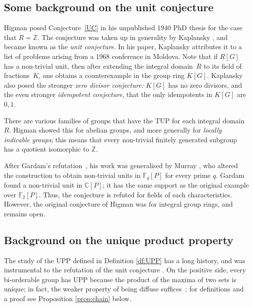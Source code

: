 \documentclass[11pt]{amsart}
\theoremstyle{mythm}
\theoremstyle{mydef}
\theoremstyle{myrem}
\numberwithin{equation}{section}
\newcommand{\ZZ}{{\mathbb{Z}}}
\begin{document}
\subsection{Some background on the unit conjecture}  
%
Higman posed Conjecture~\ref{UC}     in his unpublished 1940 PhD thesis \cite[p.~77]{H1}  for the case that $R = \ZZ$. The conjecture was  taken up  in generality  by Kaplansky \cite{K1}, and  became known as the   \textit{unit conjecture}.  In his paper, Kaplansky attributes it to a list of problems arising from a 1968 conference in Moldova.  Note that if  $R[G]$  has a non-trivial unit, then after extending  the integral domain~$R$ to  its field of fractions~$K$, one  obtains a   counterexample   in   the group ring $K[G]$.   Kaplansky also posed the stronger  {\it zero divisor conjecture:} $K[G]$ has no zero divisors, and the even stronger {\it idempotent conjecture}, that  the only idempotents in $K[G]$ are $0,1$.
 

There are various families   of groups that have the TUP for each integral domain $R$.   Higman   showed this    for abelian groups, and more generally for \textit{locally indicable groups}; this means that    every non-trivial finitely generated subgroup has a quotient isomorphic to $\mathbb{Z}$. 


 
After Gardam's refutation~\cite{G}, his work was generalised by Murray \cite{murray}, who altered the  construction to obtain    non-trivial units in $\mathbb{F}_q[P]$ for every prime $q$.   Gardam \cite{G2}   found   a non-trivial unit in $\mathbb{C}[P]$; it has   the same support as the original example over $\mathbb{F}_2[P]$. Thus, the conjecture is refuted for fields of each characteristics. However, the original conjecture of Higman was   for integral group rings, and   remains open. 
 


\subsection{Background on the unique product property}

The study of the UPP defined in Definition \ref{df:UPP} has a long history, and    was instrumental to   the refutation of the unit conjecture \cite{G}.
On the positive side, every bi-orderable group has UPP because the product of the maxima of two sets is unique; in fact, the weaker property of being diffuse suffices~\cite{bowditch}; for definitions and a proof see Proposition \ref{prop:chain} below.
\end{document}
